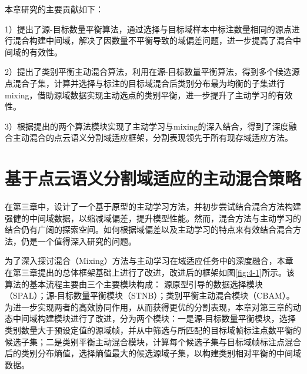     
    本章研究的主要贡献如下：

    1）提出了源-目标数量平衡算法，通过选择与目标域样本中标注数量相同的源点进行混合构建中间域，解决了因数量不平衡导致的域偏差问题，进一步提高了混合中间域的有效性。

    2）提出了类别平衡主动混合算法，利用在源-目标数量平衡算法，得到多个候选源点混合子集，计算并选择与标注的目标域混合后类别分布最为均衡的子集进行mixing，借助源域数据实现主动选点的类别平衡，进一步提升了主动学习的有效性。

    3）根据提出的两个算法模块实现了主动学习与mixing的深入结合，得到了深度融合主动混合的点云语义分割域适应框架，分割表现领先于所有现存域适应方法。


    \section{基于点云语义分割域适应的主动混合策略}
    在第三章中，设计了一个基于原型的主动学习方法，并初步尝试结合混合方法构建强健的中间域数据，以缩减域偏差，提升模型性能。然而，混合方法与主动学习的结合仍有广阔的探索空间。如何根据域偏差以及主动学习的特点来有效结合混合方法，仍是一个值得深入研究的问题。

    为了深入探讨混合（Mixing）方法与主动学习在域适应任务中的深度融合，本章在第三章提出的总体框架基础上进行了改进，改进后的框架如图\ref{fig:4-1}所示。该算法的基本流程主要由三个主要模块构成：%
    源原型引导的数据选择模块（SPAL）；源-目标数量平衡模块（STNB）；类别平衡主动混合模块（CBAM）。为进一步实现两者的高效协同作用，从而获得更优的分割表现，本章对第三章的动态中间域构建模块进行了改进，分为两个模块：一是源-目标数量平衡模块，选择类别数量大于预设定值的源域帧，并从中筛选与所匹配的目标域帧标注点数平衡的候选子集；二是类别平衡主动混合模块，计算每个候选子集与目标域帧标注点混合后的类别分布熵值，选择熵值最大的候选源域子集，以构建类别相对平衡的中间域数据。

